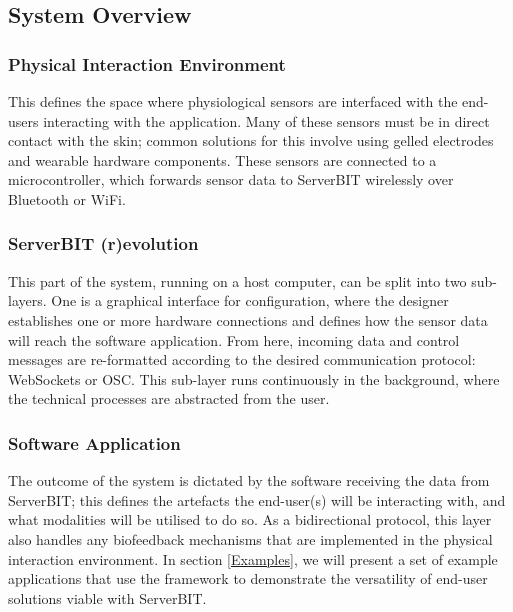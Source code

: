 \subsection{System Overview}

\subsubsection{Physical Interaction Environment}
This defines the space where physiological sensors are interfaced with the end-users interacting with the application. Many of these sensors must be in direct contact with the skin; common solutions for this involve using gelled electrodes and wearable hardware components. These sensors are connected to a microcontroller, which forwards sensor data to ServerBIT wirelessly over Bluetooth or WiFi.

\subsubsection{ServerBIT (r)evolution}
This part of the system, running on a host computer, can be split into two sub-layers. One is a graphical interface for configuration, where the designer establishes one or more hardware connections and defines how the sensor data will reach the software application. From here, incoming data and control messages are re-formatted according to the desired communication protocol: WebSockets or OSC. This sub-layer runs continuously in the background, where the technical processes are abstracted from the user.

\subsubsection{Software Application}
The outcome of the system is dictated by the software receiving the data from ServerBIT; this defines the artefacts the end-user(s) will be interacting with, and what modalities will be utilised to do so.
As a bidirectional protocol, this layer also handles any biofeedback mechanisms that are implemented in the physical interaction environment.
In section \ref{Examples}, we will present a set of example applications that use the framework to demonstrate the versatility of end-user solutions viable with ServerBIT.



